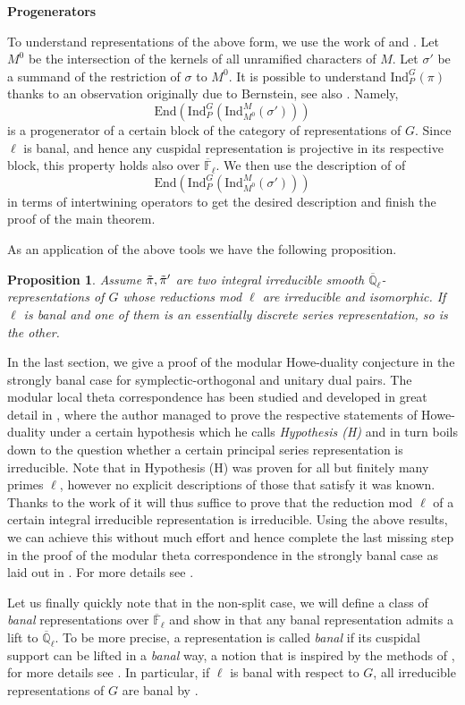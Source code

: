 \documentclass[10pt,a4paper]{article}
\newtheorem{prop}{Proposition}
\theoremstyle{remark}
\theoremstyle{definition}
\newcommand{\fl}{{\overline{\mathbb{F}}_\ell}}
\newcommand{\ql}{{\overline{\mathbb{Q}}_\ell}}
\newcommand{\ip}{\mathrm{Ind}_P^G}
\newcommand{\id}{\mathrm{Ind}}
\newcommand{\tpi}{\Tilde{\pi}}
\newcommand{\ed}{\mathrm{End}}
\begin{document}
\textbf{Progenerators}

To understand representations of the above form, we use 
the work of \cite{Heiermann2011} and \cite{Roche_2002}. Let $M^0$ be the intersection of the kernels of all unramified characters of $M$. Let $\sigma'$ be a summand of the restriction of $\sigma$ to $M^0$.
It is possible to understand $\ip(\pi)$ thanks to an observation originally due to Bernstein, see also \cite{Roche_2002}. Namely, \[\ed(\ip(\id_{M^0}^M(\sigma')))\] is a progenerator of a certain block of the category of representations of $G$. Since $\ell$ is banal, and hence any cuspidal representation is projective in its respective block, this property holds also over $\fl$.
We then use the description of \cite{Heiermann2011} of \[\ed(\ip(\id_{M^0}^M(\sigma')))\] in terms of intertwining operators to get the desired description and finish the proof of the main theorem.

As an application of the above tools we have the following proposition.
\begin{prop}
    Assume $\tpi,\tpi'$ are two integral irreducible smooth $\ql$- representations of $G$ whose reductions mod $\ell$ are irreducible and isomorphic. If $\ell$ is banal and one of them is an essentially discrete series representation, so is the other.
\end{prop}
In the last section, we give a proof of the modular Howe-duality conjecture in the strongly banal case for symplectic-orthogonal and unitary dual pairs. The modular local theta correspondence has been studied and developed in great detail in \cite{Trias2025}, where the author managed to prove the respective statements of Howe-duality under a certain hypothesis which he calls \emph{Hypothesis (H)} and in turn boils down to the question whether a certain principal series representation is irreducible. Note that in \cite{Trias2025} Hypothesis (H) was proven for all but finitely many primes $\ell$, however no explicit descriptions of those that satisfy it was known.
Thanks to the work of \cite{Trias2025} it will thus suffice to prove that the reduction mod $\ell$ of a certain integral irreducible representation is irreducible.
Using the above results, we can achieve this without much effort and hence complete the last missing step in the proof of the modular theta correspondence in the strongly banal case as laid out in \cite{Trias2025}. For more details see .

Let us finally quickly note that in the non-split case, we will define a class of \emph{banal} representations over $\fl$ and show in  that any banal representation admits a lift to $\ql$. To be more precise, a representation is called \emph{banal} if its cuspidal support can be lifted in a \emph{banal} way, a notion that is inspired by the methods of \cite{minguez2013representations}, for more details see . In particular, if $\ell$ is banal with respect to $G$, all irreducible representations of $G$ are banal by .
\end{document}
